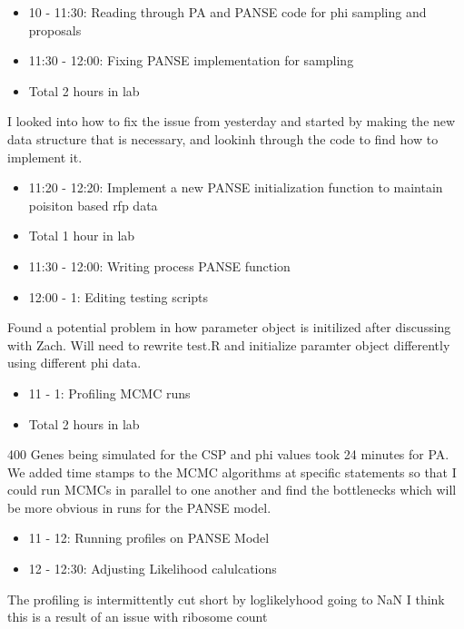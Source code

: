 \documentclass[12pt,hyperref]{labbook}
\begin{document}
\begin{itemize}
    \item 10 - 11:30: Reading through PA and PANSE code for phi sampling and proposals
    \item 11:30 - 12:00: Fixing PANSE implementation for sampling
    \item Total 2 hours in lab
\end{itemize}
I looked into how to fix the issue from yesterday and started by making the new data structure that is necessary,
and lookinh through the code to find how to implement it.
\begin{itemize}
    \item 11:20 - 12:20: Implement a new PANSE initialization function to maintain poisiton based rfp data
    \item Total 1 hour in lab
\end{itemize}
\begin{itemize}
    \item 11:30 - 12:00: Writing process PANSE function
    \item 12:00 - 1: Editing testing scripts
\end{itemize}
Found a potential problem in how parameter object is initilized after discussing with Zach. Will need to rewrite test.R and
initialize paramter object differently using different phi data.
\begin{itemize}
    \item 11 - 1: Profiling MCMC runs
    \item Total 2 hours in lab
\end{itemize}
400 Genes being simulated for the CSP and phi values took 24 minutes for PA. We added time stamps to the MCMC algorithms
at specific statements so that I could run MCMCs in parallel to one another and find the bottlenecks which will be more obvious in runs for the PANSE model.
\begin{itemize}
    \item 11 - 12: Running profiles on PANSE Model
    \item 12 - 12:30: Adjusting Likelihood calulcations
\end{itemize}
The profiling is intermittently cut short by loglikelyhood going to NaN I think this is a result of an issue with ribosome count
\end{document}
